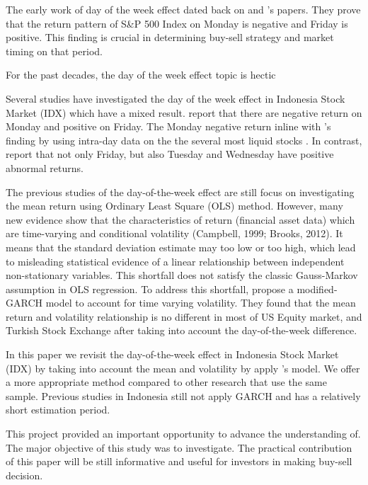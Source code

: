 \documentclass[12pt]{article}
\begin{document}
The early work of day of the week effect dated back on \cite{Cross1973} and \cite{French1980}'s papers. They prove that the return pattern of  S\&P 500 Index on Monday is negative and Friday is positive. This finding is crucial in determining buy-sell strategy and market timing on that period.

For the past decades, the day of the week effect topic is hectic 

Several studies have investigated the day of the week effect in Indonesia Stock Market (IDX) which have a mixed result. \cite{Cahyaningdyah2005} report that there are negative return on Monday and positive on Friday. The Monday negative return inline with \cite{Sumiyana2008}'s finding by using intra-day data on the the several most liquid stocks . In contrast, \cite{Tandelilin1999} report that not only Friday, but also Tuesday and Wednesday have positive abnormal returns. 

The previous studies of the day-of-the-week effect are still focus on investigating the mean return using Ordinary Least Square (OLS) method. However,  many new evidence show that the characteristics of return (financial asset data) which are time-varying and conditional volatility (Campbell, 1999; Brooks, 2012). It means that the standard deviation estimate may too low or too high, which lead to misleading statistical evidence of a linear relationship between independent non-stationary variables. This shortfall does not satisfy the classic Gauss-Markov assumption in OLS regression. To address this shortfall, \cite{Berument2001, Berument2012} propose a modified-GARCH model to account for time varying volatility. They found that the mean return and volatility relationship is no different in most of US Equity market, and Turkish Stock Exchange after taking into account the day-of-the-week difference.

In this paper we revisit the day-of-the-week effect in Indonesia Stock Market (IDX) by taking into account the mean and volatility by apply \cite{Berument2012}'s model. We offer a more appropriate method compared to other research that use the same sample. Previous studies in Indonesia still not apply GARCH and has a relatively short estimation period. 

This project provided an important opportunity to advance the understanding of. The major objective of this study was to investigate. The practical contribution of this paper will be still informative and useful for investors in making buy-sell decision.
\end{document}
